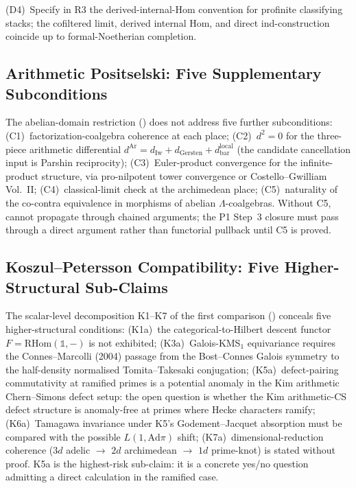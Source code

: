 (D4)~Specify in R3 the derived-internal-Hom convention for profinite
classifying stacks; the cofiltered limit, derived internal Hom, and
direct ind-construction coincide up to formal-Noetherian completion.

\subsection{Arithmetic Positselski: Five Supplementary Subconditions}

The abelian-domain restriction ()
does not address five further subconditions:
(C1)~factorization-coalgebra coherence at each place;
(C2)~\(d^{2}=0\) for the three-piece arithmetic differential
\(d^{\mathrm{Ar}}=d_{\mathrm{Iw}}+d_{\mathrm{Gersten}}+d_{\mathrm{bar}}^{\mathrm{local}}\)
(the candidate cancellation input is Parshin reciprocity);
(C3)~Euler-product convergence for the infinite-product structure,
via pro-nilpotent tower convergence or Costello--Gwilliam Vol.~II;
(C4)~classical-limit check at the archimedean place;
(C5)~naturality of the co-contra equivalence in morphisms of
abelian \(\Lambda\)-coalgebras.
Without C5,  cannot
propagate through chained arguments; the P1 Step~3 closure must
pass through a direct argument rather than functorial pullback
until C5 is proved.

\subsection{Koszul--Petersson Compatibility: Five Higher-Structural Sub-Claims}

The scalar-level decomposition K1--K7 of the first comparison
() conceals five higher-structural
conditions:
(K1a)~the categorical-to-Hilbert descent functor
\(F=\mathrm{RHom}(\mathbb{1},-)\) is not exhibited;
(K3a)~Galois-KMS\({}_{1}\) equivariance requires the Connes--Marcolli
(2004) passage from the Bost--Connes Galois symmetry to the
half-density normalised Tomita--Takesaki conjugation;
(K5a)~defect-pairing commutativity at ramified primes is a potential
anomaly in the Kim arithmetic Chern--Simons defect setup: the open
question is whether the Kim arithmetic-CS defect structure is
anomaly-free at primes where Hecke characters ramify;
(K6a)~Tamagawa invariance under K5's Godement--Jacquet absorption
must be compared with the possible \(L(1,\mathrm{Ad}\pi)\) shift;
(K7a)~dimensional-reduction coherence
(\(3d\) adelic \(\to\) \(2d\) archimedean \(\to\) \(1d\) prime-knot)
is stated without proof.
K5a is the highest-risk sub-claim: it is a concrete yes/no question
admitting a direct calculation in the ramified case.

